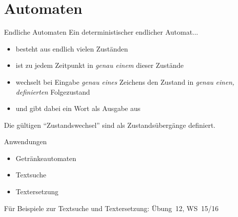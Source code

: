 \section{Automaten}

\begin{frame}{Endliche Automaten}
	Ein deterministischer endlicher Automat...
	\begin{itemize}
		\item besteht aus endlich vielen Zuständen
		\item ist zu jedem Zeitpunkt in \emph{genau einem} dieser Zustände
		\item wechselt bei Eingabe \emph{genau eines} Zeichens den Zustand in \emph{genau einen, definierten} Folgezustand
		\item und gibt dabei ein Wort als Ausgabe aus
	\end{itemize}

	Die gültigen \enquote{Zustandswechsel} sind als Zustandsübergänge definiert.
\end{frame}

\begin{frame}{Anwendungen}
	\begin{itemize}
		\item Getränkeautomaten
		\item Textsuche
		\item Textersetzung
	\end{itemize}

	Für Beispiele zur Textsuche und Textersetzung: Übung~12, WS~15/16
\end{frame}


